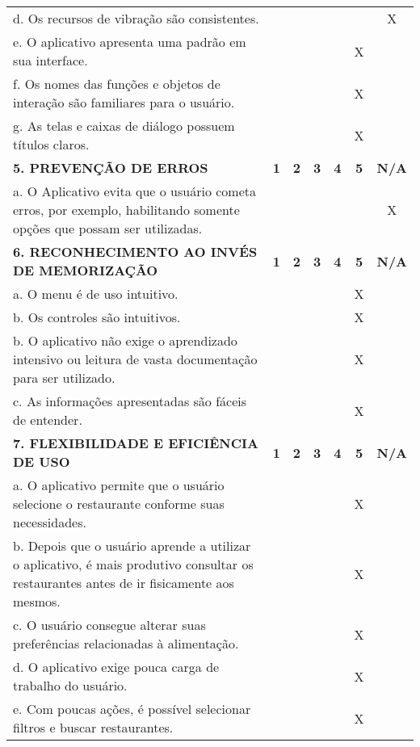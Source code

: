 \documentclass[portuguese,oneside]{tcc}
\begin{document}
\begin{table}[h]
{\begin{tabu}{|L{25em}|c|c|c|c|c|c|}
							d. Os recursos de vibração são consistentes. & & & & & & X \\ 
							e. O aplicativo apresenta uma padrão em sua interface. & & & & & X & \\ 
							f. Os nomes das funções e objetos de interação são familiares para o usuário. & & & & & X & \\ 
							g. As telas e caixas de diálogo possuem títulos claros. & & & & & X & \\ 
							\textbf{5. PREVENÇÃO DE ERROS} & \textbf{1} & \textbf{2} & \textbf{3} & \textbf{4} & \textbf{5} & \textbf{N/A} \\ 
							a. O Aplicativo evita que o usuário cometa erros, por exemplo, habilitando somente opções que possam ser utilizadas. & & & & & & X \\ 
							\textbf{6. RECONHECIMENTO AO INVÉS DE MEMORIZAÇÃO} & \textbf{1} & \textbf{2} & \textbf{3} & \textbf{4} & \textbf{5} & \textbf{N/A} \\ 
							a. O  menu é de uso intuitivo. & & & & & X & \\ 
							b. Os controles são intuitivos. & & & & & X & \\ 
							b. O aplicativo não exige o aprendizado intensivo ou leitura de vasta documentação para ser utilizado. & & & & & X & \\ 
							c. As informações apresentadas são fáceis de entender. & & & & & X & \\ 
							\textbf{7. FLEXIBILIDADE E EFICIÊNCIA DE USO} & \textbf{1} & \textbf{2} & \textbf{3} & \textbf{4} & \textbf{5} & \textbf{N/A} \\ 
							a. O aplicativo permite que o usuário selecione o restaurante conforme suas necessidades. & & & & & X & \\ 
							b. Depois que o usuário aprende a utilizar o aplicativo, é mais produtivo consultar os restaurantes antes de ir fisicamente aos mesmos. & & & & & X & \\ 
							c. O usuário consegue alterar suas preferências relacionadas à alimentação. & & & & & X & \\ 
							d. O aplicativo exige pouca carga de trabalho do usuário. & & & & & X & \\ 
							e. Com poucas ações, é possível selecionar filtros e buscar restaurantes. & & & & & X & \\ 

\end{tabu}}
\end{table}
\end{document}
